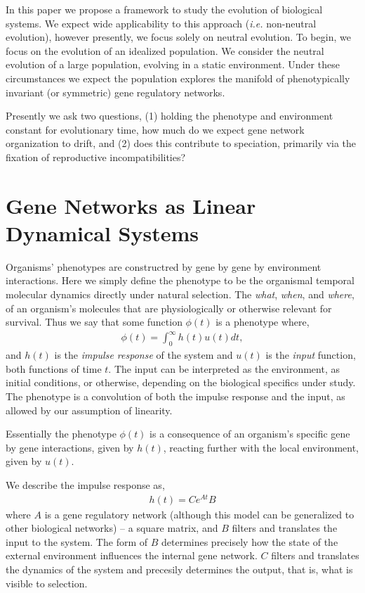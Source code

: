 \documentclass[9 pt]{article}
\newcommand{\1}{\mathbbm{1}}
\begin{document}
  In this paper we propose a framework to study the evolution of biological systems. We expect wide applicability to this approach (\emph{i.e.} non-neutral evolution), however presently, we focus solely on neutral evolution. To begin, we focus on the evolution of an idealized population. We consider the neutral evolution of a large population, evolving in a static environment. Under these circumstances we expect the population explores the manifold of phenotypically invariant (or symmetric) gene regulatory networks.

  Presently we ask two questions, (1) holding the phenotype and environment constant for evolutionary time, how much do we expect gene network organization to drift, and (2) does this contribute to speciation, primarily via the fixation of reproductive incompatibilities?

\section*{Gene Networks as Linear Dynamical Systems}

  Organisms' phenotypes are constructred by gene by gene by environment interactions. Here we simply define the phenotype to be the organismal temporal molecular dynamics directly under natural selection. The \emph{what}, \emph{when}, and \emph{where}, of an organism's molecules that are physiologically or otherwise relevant for survival. 
   Thus we say that some function $\phi(t)$ is a phenotype where, 
  \begin{align}
    \phi(t) = \int_{0}^{\infty} h(t) u(t) dt  ,
  \end{align}
  and $h(t)$ is the \emph{impulse response} of the system and $u(t)$ is the \emph{input} function, both functions of time $t$. The input can be interpreted as the environment, as initial conditions, or otherwise, depending on the biological specifics under study. The phenotype is a convolution of both the impulse response and the input, as allowed by our assumption of linearity. 

  Essentially the phenotype $\phi(t)$ is a consequence of an organism's specific gene by gene interactions, given by $h(t)$, reacting further with the local environment, given by $u(t)$. 

  We describe the impulse response as, 
  \begin{align}
    h(t) = C e^{A t} B
  \end{align}
  where $A$ is a gene regulatory network (although this model can be generalized to other biological networks) -- a square matrix, and $B$ filters and translates the input to the system. The form of $B$ determines precisely how the state of the external environment influences the internal gene network. $C$ filters and translates the dynamics of the system and precesily determines the output, that is, what is visible to selection. 
\end{document}

